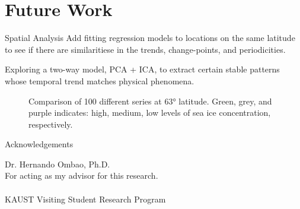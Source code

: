 \documentclass[10pt]{beamer}
\begin{document}
\section{Future Work}
\begin{frame}{Spatial Analysis}
Add fitting regression models to locations on the same latitude to see if there are similaritiese in the trends, change-points, and periodicities.

Exploring a two-way model, PCA + ICA, to extract certain stable patterns whose temporal trend matches physical phenomena.

\begin{figure}[!tbp]
  \centering
  \hfill
  \caption{Comparison of 100 different series at 63° latitude. Green, grey, and purple indicates: high, medium, low levels of sea ice concentration, respectively.}
\end{figure}

\end{frame}

\begin{frame}{Acknowledgements}

Dr. Hernando Ombao, Ph.D. \\
\hspace{6} For acting as my advisor for this research. \\

\\
\vspace{\baselineskip}\linebreak
KAUST Visiting Student Research Program
\end{frame}
\end{document}
